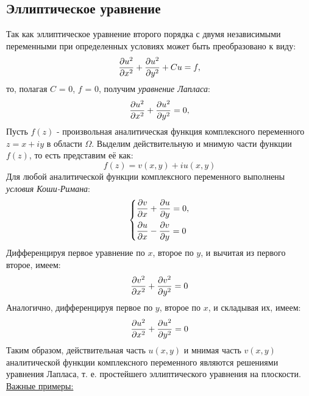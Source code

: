 \documentclass[../main.tex]{subfiles}
\begin{document}
\subsection{Эллиптическое уравнение}
Так как эллиптическое уравнение второго порядка с двумя независимыми переменными при определенных условиях может быть преобразовано к виду:
\[
    \pderivTwo{u}{x}{x} + \pderivTwo{u}{y}{y} + Cu = f,
\]
то, полагая $C$ = 0, $f$ = 0, получим \textit{уравнение Лапласа}:
\[
    \pderivTwo{u}{x}{x} + \pderivTwo{u}{y}{y} = 0,
\]
Пусть $f(z)$ - произвольная аналитическая функция комплексного переменного $z = x + iy$ в области $\Omega$. Выделим действительную и мнимую части функции $f(z)$, то есть представим её как:
\[
    f(z) = v(x, y) + iu(x,y)
\]
Для любой аналитической функции комплексного переменного
выполнены \textit{условия Коши-Римана}:
\[
\begin{dcases}
        \frac{\partial v}{\partial x} + \frac{\partial u}{\partial y} = 0,\\
        \frac{\partial u}{\partial x} - \frac{\partial v}{\partial y} = 0
\end{dcases}
\]
Дифференцируя первое уравнение по $x$, второе по $y$, и вычитая из первого второе, имеем:
\[
    \pderivTwo{v}{x}{x} + \pderivTwo{v}{y}{y} = 0
\]
Аналогично, дифференцируя первое по $y$, второе по $x$, и складывая их, имеем:
\[
    \pderivTwo{u}{x}{x} + \pderivTwo{u}{y}{y} = 0
\]
Таким образом, действительная часть $u(x, y)$ и мнимая часть $v(x, y)$ аналитической функции комплексного переменного являются решениями уравнения Лапласа, т. е. простейшего эллиптического уравнения на плоскости.\\
\underline{Важные примеры:}
\end{document}
